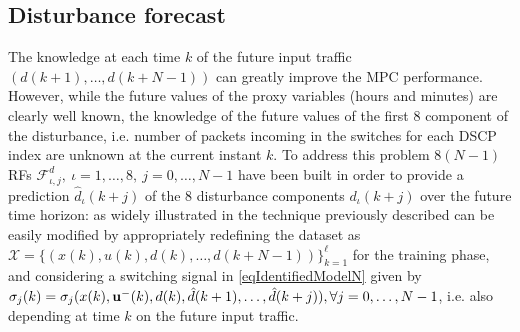 
\subsection{Disturbance forecast} The knowledge at each time $k$ of the future input traffic $(d(k+1), \ldots, d(k+N-1))$ can greatly improve the MPC performance. However, while the future values of the proxy variables (hours and minutes) are clearly well known, the knowledge of the future values of the first 8 component of the disturbance, i.e. number of packets incoming in the switches for each DSCP index are unknown at the current instant $k$. To address this problem $8(N-1)$ RFs $\mathcal{F}^d_{\iota,j},\ \iota=1,\ldots,8,\ j = 0,\ldots,N-1$ have been built in order to provide a prediction $\hat d_\iota(k+j)$ of the 8 disturbance components $d_\iota(k+j)$ over the future time horizon: as widely illustrated in \cite{SmarraADHS2018,smarraNAHS2020} the technique previously described can be easily modified by appropriately redefining the dataset as $\mathcal{X} = \{(x(k), u(k), d(k),\ldots,d(k+N-1))\}_{k=1}^{\ell}$ for the training phase, and considering a switching signal in \eqref{eqIdentifiedModelN} given by $\sigma_j(k) = \sigma_j(x(k),\bold{u^-}(k),d(k),\hat d(k+1),\ldots,\hat d(k+j)), \forall j=0,\ldots,N-1$, i.e. also depending at time $k$ on the future input traffic.

